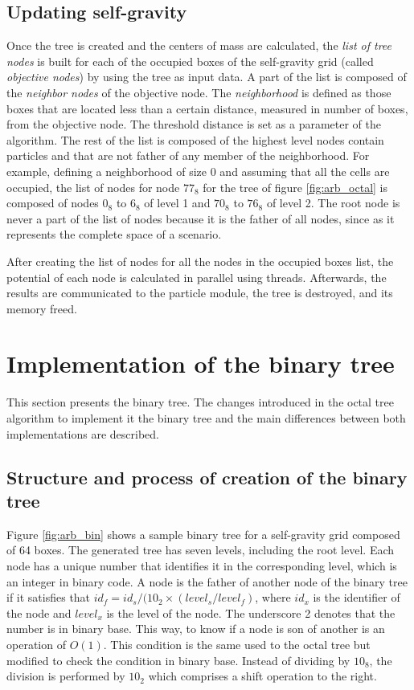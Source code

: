 \documentclass[runningheads]{llncs}
\begin{document}
\subsection{Updating self-gravity}

Once the tree is created and the centers of mass are calculated, the \textit{list of tree nodes} is built for each of the occupied boxes of the self-gravity grid (called \textit{objective nodes}) by using the tree as input data. A part of the list is composed of the \textit{neighbor nodes} of the objective node. The \textit{neighborhood} is defined as those boxes that are located less than a certain distance, measured in number of boxes, from the objective node. The threshold distance is set as a parameter of the algorithm. The rest of the list is composed of the highest level nodes contain particles and that are not father of any member of the neighborhood. For example, defining a neighborhood of size 0 and assuming that all the cells are occupied, the list of nodes for node $77_8$ for the tree of figure \ref{fig:arb_octal} is composed of nodes $0_8$ to $6_8$ of level 1 and $70_8$ to $76_8$ of level 2. The root node is never a part of the list of nodes because it is the father of all nodes, since as it represents the complete space of a scenario.

After creating the list of nodes for all the nodes in the occupied boxes list, the potential of each node is calculated in parallel using threads. Afterwards, the results are communicated to the particle module, the tree is destroyed, and its memory freed.  

\section{Implementation of the binary tree}
\label{sec:bin_byh}

This section presents the binary tree. The changes introduced in the octal tree algorithm to implement it the binary tree and the main differences between both implementations are described. 

\subsection{Structure and process of creation of the binary tree}

Figure \ref{fig:arb_bin} shows a sample binary tree for a self-gravity grid composed of 64 boxes. The generated tree has seven levels, including the root level. Each node has a unique number that identifies it in the corresponding level, which is an integer in binary code. A node is the father of another node of the binary tree if it satisfies that $id_f=id_s/(10_2 \times (level_s / level_f)$, where $id_x$ is the identifier of the node and $level_x$ is the level of the node. The underscore 2 denotes that the number is in binary base. This way, to know if a node is son of another is an operation of $O(1)$. This condition is the same used to the octal tree but modified to check the condition in binary base. Instead of dividing by $10_8$, the division is performed by $10_2$ which comprises a shift operation to the right. 
\end{document}
